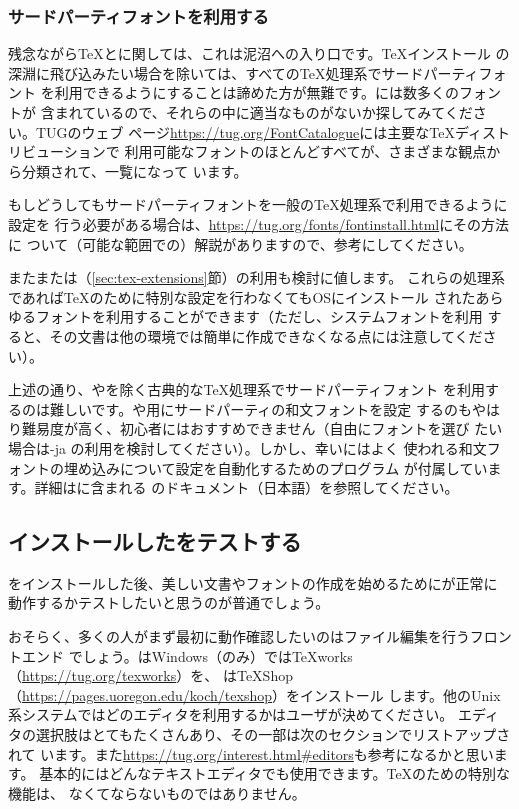 \documentclass[uplatex,dvipdfmx,12pt]{jsarticle}
\begin{document}
\subsubsection{サードパーティフォントを利用する}

残念ながら\TeX と\pdfTeX に関しては、これは泥沼への入り口です。\TeX インストール
の深淵に飛び込みたい場合を除いては、すべての\TeX 処理系でサードパーティフォント
を利用できるようにすることは諦めた方が無難です。\TL には数多くのフォントが
含まれているので、それらの中に適当なものがないか探してみてください。TUGのウェブ
ページ\url{https://tug.org/FontCatalogue}には主要な\TeX ディストリビューションで
利用可能なフォントのほとんどすべてが、さまざまな観点から分類されて、一覧になって
います。

もしどうしてもサードパーティフォントを一般の\TeX 処理系で利用できるように設定を
行う必要がある場合は、\url{https://tug.org/fonts/fontinstall.html}にその方法に
ついて（可能な範囲での）解説がありますので、参考にしてください。

また\XeTeX または\LuaTeX （\ref{sec:tex-extensions}節）の利用も検討に値します。
これらの処理系であれば\TeX のために特別な設定を行わなくてもOSにインストール
されたあらゆるフォントを利用することができます（ただし、システムフォントを利用
すると、その文書は他の環境では簡単に作成できなくなる点には注意してください）。

\begin{janote}
上述の通り、\XeTeX や\LuaTeX を除く古典的な\TeX 処理系でサードパーティフォント
を利用するのは難しいです。\pTeX や\upTeX 用にサードパーティの和文フォントを設定
するのもやはり難易度が高く、初心者にはおすすめできません（自由にフォントを選び
たい場合は\LuaTeX-ja の利用を検討してください）。しかし、幸い\TL にはよく
使われる和文フォントの埋め込みについて設定を自動化するためのプログラム
が付属しています。詳細は\TL に含まれる
のドキュメント（日本語）を参照してください。
\end{janote}

\subsection{インストールした\TL をテストする}
\label{sec:test-install}

\TL をインストールした後、美しい文書やフォントの作成を始めるために\TL が正常に
動作するかテストしたいと思うのが普通でしょう。

おそらく、多くの人がまず最初に動作確認したいのはファイル編集を行うフロントエンド
でしょう。\TL はWindows（のみ）では{\TeX}works（\url{https://tug.org/texworks}）を、
\MacTeX は{\TeX}Shop（\url{https://pages.uoregon.edu/koch/texshop}）をインストール
します。他のUnix系システムではどのエディタを利用するかはユーザが決めてください。
エディタの選択肢はとてもたくさんあり、その一部は次のセクションでリストアップされて
います。また\url{https://tug.org/interest.html#editors}も参考になるかと思います。
基本的にはどんなテキストエディタでも使用できます。\TeX のための特別な機能は、
なくてならないものではありません。
\end{document}
